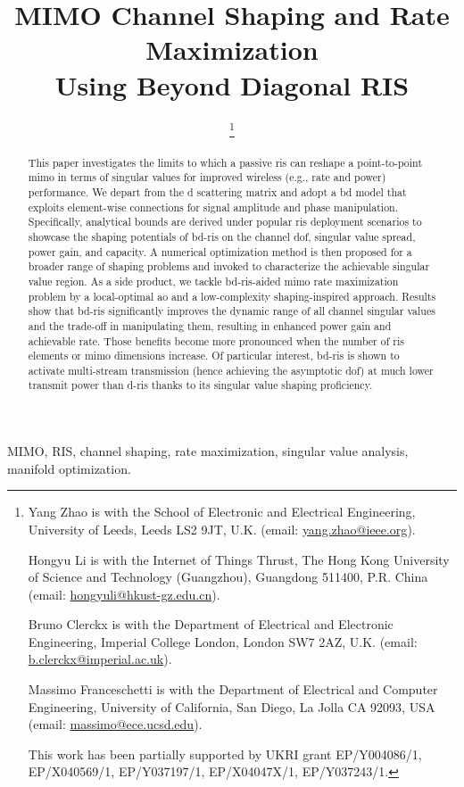 \documentclass[journal]{IEEEtran}
\title{MIMO Channel Shaping and Rate Maximization\\Using Beyond Diagonal RIS}
\author{
	\IEEEauthorblockN{
		Yang Zhao, \IEEEmembership{Member, IEEE,}
		Hongyu Li, \IEEEmembership{Member, IEEE,}\\
		Bruno Clerckx, \IEEEmembership{Fellow, IEEE,}
		and Massimo Franceschetti, \IEEEmembership{Fellow, IEEE}
	}
	\thanks{
		Yang Zhao is with the School of Electronic and Electrical Engineering, University of Leeds, Leeds LS2 9JT, U.K. (email: \href{mailto:yang.zhao@ieee.org}{yang.zhao@ieee.org}).

		Hongyu Li is with the Internet of Things Thrust, The Hong Kong University of Science and Technology (Guangzhou), Guangdong 511400, P.R. China (email: \href{mailto:hongyuli@hkust-gz.edu.cn}{hongyuli@hkust-gz.edu.cn}).

		Bruno Clerckx is with the Department of Electrical and Electronic Engineering, Imperial College London, London SW7 2AZ, U.K. (email: \href{mailto:b.clerckx@imperial.ac.uk}{b.clerckx@imperial.ac.uk}).

		Massimo Franceschetti is with the Department of Electrical and Computer Engineering, University of California, San Diego, La Jolla CA 92093, USA (email: \href{mailto:massimo@ece.ucsd.edu}{massimo@ece.ucsd.edu}).

		This work has been partially supported by UKRI grant EP/Y004086/1, EP/X040569/1, EP/Y037197/1, EP/X04047X/1, EP/Y037243/1.
	}
}
\begin{document}
\maketitle

\begin{abstract}
	This paper investigates the limits to which a passive \gls{ris} can reshape a point-to-point \gls{mimo} in terms of singular values for improved wireless (e.g., rate and power) performance.
	We depart from the \gls{d} scattering matrix and adopt a \gls{bd} model that exploits element-wise connections for signal amplitude and phase manipulation.
	Specifically, analytical bounds are derived under popular \gls{ris} deployment scenarios to showcase the shaping potentials of \gls{bd}-\gls{ris} on the channel \gls{dof}, singular value spread, power gain, and capacity.
	A numerical optimization method is then proposed for a broader range of shaping problems and invoked to characterize the achievable singular value region.
	As a side product, we tackle \gls{bd}-\gls{ris}-aided \gls{mimo} rate maximization problem by a local-optimal \gls{ao} and a low-complexity shaping-inspired approach.
	Results show that \gls{bd}-\gls{ris} significantly improves the dynamic range of all channel singular values and the trade-off in manipulating them, resulting in enhanced power gain and achievable rate.
	Those benefits become more pronounced when the number of \gls{ris} elements or \gls{mimo} dimensions increase.
	Of particular interest, \gls{bd}-\gls{ris} is shown to activate multi-stream transmission (hence achieving the asymptotic \gls{dof}) at much lower transmit power than \gls{d}-\gls{ris} thanks to its singular value shaping proficiency.
\end{abstract}

\begin{IEEEkeywords}
	MIMO, RIS, channel shaping, rate maximization, singular value analysis, manifold optimization.
\end{IEEEkeywords}

\glsresetall
\end{document}
